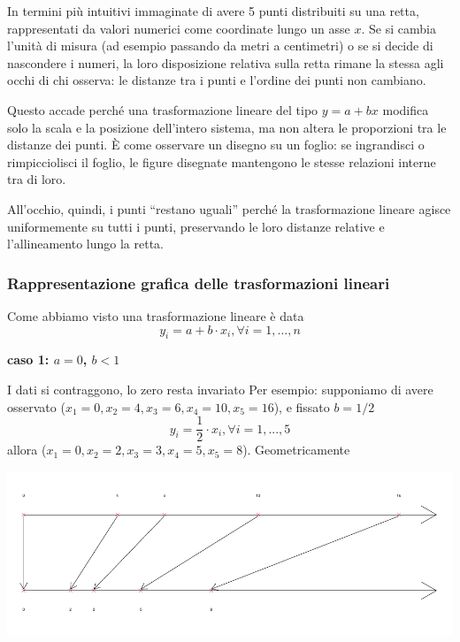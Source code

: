 \documentclass[
  11pt,
]{book}
\theoremstyle{mytheoremstyle}
\theoremstyle{mydefstyle}
\begin{document}
In termini più intuitivi immaginate di avere 5 punti distribuiti su una retta, rappresentati da valori numerici come coordinate lungo un asse \(x\). Se si cambia l'unità di misura (ad esempio passando da metri a centimetri) o se si decide di nascondere i numeri, la loro disposizione relativa sulla retta rimane la stessa agli occhi di chi osserva: le distanze tra i punti e l'ordine dei punti non cambiano.

Questo accade perché una trasformazione lineare del tipo \(y = a + bx\) modifica solo la scala e la posizione dell'intero sistema, ma non altera le proporzioni tra le distanze dei punti. È come osservare un disegno su un foglio: se ingrandisci o rimpicciolisci il foglio, le figure disegnate mantengono le stesse relazioni interne tra di loro.

All'occhio, quindi, i punti ``restano uguali'' perché la trasformazione lineare agisce uniformemente su tutti i punti, preservando le loro distanze relative e l'allineamento lungo la retta.

\subsubsection{Rappresentazione grafica delle trasformazioni lineari}\label{rappresentazione-grafica-delle-trasformazioni-lineari}

Come abbiamo visto una trasformazione lineare è data
\[
y_i= a+ b\cdot x_i, \forall i =1,...,n
\]

\textbf{caso 1: \(a=0\), \(b<1\)}

I dati si contraggono, lo zero resta invariato
Per esempio: supponiamo di avere osservato (\(x_1=0, x_2=4, x_3=6, x_4=10, x_5=16\)), e fissato \(b=1/2\)
\[
y_i= \frac{1}{2} \cdot x_i, \forall i = 1,...,5
\]
allora (\(x_1=0, x_2=2, x_3=3, x_4=5, x_5=8\)). Geometricamente

\begin{center}\includegraphics{Appunti_di_Statistica_2025_files/figure-latex/tranf-lin-gr1-1} \end{center}
\end{document}
